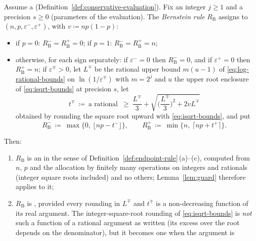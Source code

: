 \begin{proposition}\label{prop:rule-bernstein}
Assume a 
(Definition~\ref{def:conservative-evaluation}). Fix an integer $j\ge1$ and a
precision $s\ge0$ (parameters of the evaluation). The \emph{Bernstein rule}
$R_{\mathrm{B}}$ assigns to
$(n,p,\varepsilon^{-},\varepsilon^{+})$, with $v\coloneqq np(1-p)$:
\begin{itemize}[leftmargin=1.9em]
\item if $p=0$: $R^{-}_{\mathrm{B}}=R^{+}_{\mathrm{B}}=0$; if $p=1$:
$R^{-}_{\mathrm{B}}=R^{+}_{\mathrm{B}}=n$;
\item otherwise, for each sign separately: if $\varepsilon^{-}=0$ then
$R^{-}_{\mathrm{B}}=0$, and if $\varepsilon^{+}=0$ then
$R^{+}_{\mathrm{B}}=n$; if $\varepsilon^{\mp}>0$, let $L^{\mp}$ be the
rational upper bound $m(u-1)$ of \eqref{eq:log-rational-bounds} on
$\ln(1/\varepsilon^{\mp})$ with $m=2^{j}$ and $u$ the upper root enclosure
of \eqref{eq:isqrt-bounds} at precision $s$, let
\begin{equation}\label{eq:bernstein-endpoint-t}
  t^{\mp}\ \coloneqq\ \text{a rational }\ \ge\
  \frac{L^{\mp}}{3}+\sqrt{\Big(\frac{L^{\mp}}{3}\Big)^{2}+2vL^{\mp}}
\end{equation}
obtained by rounding the square root upward with \eqref{eq:isqrt-bounds},
and put
\begin{equation}\label{eq:bernstein-endpoints}
  R^{-}_{\mathrm{B}}\ \coloneqq\ \max\big\{0,\ \lfloor np-t^{-}\rfloor\big\},
  \qquad
  R^{+}_{\mathrm{B}}\ \coloneqq\ \min\big\{n,\ \lceil np+t^{+}\rceil\big\}.
\end{equation}
\end{itemize}
Then:
\begin{enumerate}[label=(\roman*),leftmargin=2.2em]
\item $R_{\mathrm{B}}$ is an  in the sense of
Definition~\ref{def:endpoint-rule}\,(a)--(c), computed from $n$, $p$ and the
allocation by finitely many operations on integers and rationals (integer
square roots included) and no others; Lemma~\ref{lem:guard} therefore
applies to it;
\item $R_{\mathrm{B}}$ is , provided every
rounding in $L^{\mp}$ and $t^{\mp}$ is a non-decreasing function of its
real argument. The integer-square-root rounding of \eqref{eq:isqrt-bounds}
is \emph{not} such a function of a rational argument as written (its excess over the
root depends on the denominator), but it becomes one when the argument is

\end{enumerate}
\end{proposition}
